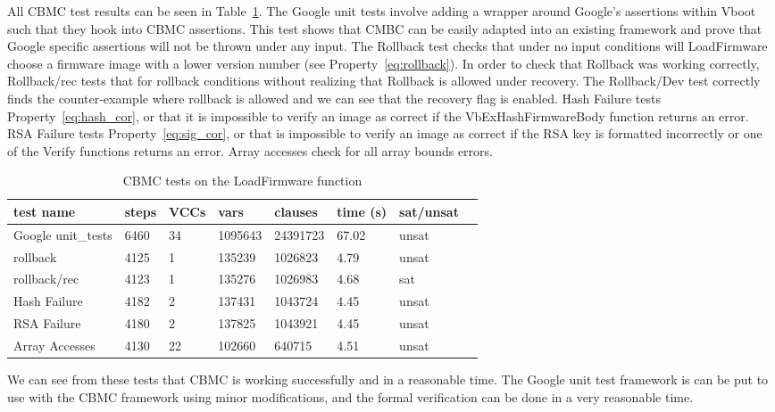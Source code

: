\documentclass[../report.tex]{subfiles}
\begin{document}
All CBMC test results can be seen in Table~\ref{ldfw_results}. 
The Google unit tests involve adding a wrapper around Google's assertions within Vboot such that they hook into CBMC assertions.
This test shows that CMBC can be easily adapted into an existing framework and prove that Google specific assertions will not be thrown under any input.
The Rollback test checks that under no input conditions will LoadFirmware choose a firmware image with a lower version number (see Property~\ref{eq:rollback}).
In order to check that Rollback was working correctly, Rollback/rec tests that for rollback conditions without realizing that Rollback is allowed under recovery. 
The Rollback/Dev test correctly finds the counter-example where rollback is allowed and we can see that the recovery flag is enabled.
Hash Failure tests Property~\ref{eq:hash_cor}, or that it is impossible to verify an image as correct if the VbExHashFirmwareBody function returns an error.
RSA Failure tests Property~\ref{eq:sig_cor}, or that is impossible to verify an image as correct if the RSA key is formatted incorrectly or one of the Verify functions returns an error.
Array accesses check for all array bounds errors.

\begin{table}[]
    \centering
    \caption{CBMC tests on the LoadFirmware function}\label{ldfw_results}
    \begin{tabular}{|l|l|l|l|l|l|l|l|}
        \hline
        test name & steps & VCCs & vars  & clauses & time (s) & sat/unsat  \\ \hline \hline
        Google unit\_tests & 6460 & 34 & 1095643 & 24391723 & 67.02 & unsat \\ \hline
        rollback     & 4125 & 1 & 135239 & 1026823 & 4.79 & unsat \\ \hline
        rollback/rec & 4123 & 1 & 135276 & 1026983 & 4.68 & sat \\ \hline
        Hash Failure & 4182 & 2 & 137431 & 1043724 & 4.45 & unsat \\ \hline
        RSA  Failure & 4180 & 2 & 137825 & 1043921 & 4.45 & unsat \\ \hline
        Array Accesses & 4130 & 22 & 102660 & 640715 & 4.51 & unsat \\ \hline
    \end{tabular}
\end{table}

We can see from these tests that CBMC is working successfully and in a reasonable time.
The Google unit test framework is can be put to use with the CBMC framework using minor modifications, and the formal verification can be done in a very reasonable time.
\end{document}
